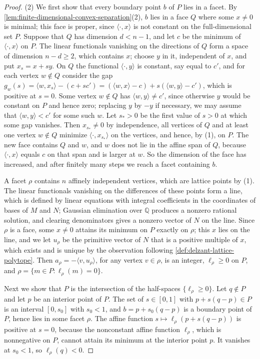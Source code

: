 \begin{proof}
(2) We first show that every boundary point $b$ of $P$ lies in a facet. By \cref{lem:finite-dimensional-convex-separation}(2), $b$ lies in a face $Q$ where some $x\neq0$ is minimal; this face is proper, since $\langle\cdot,x\rangle$ is not constant on the full-dimensional set $P$. Suppose that $Q$ has dimension $d<n-1$, and let $c$ be the minimum of $\langle\cdot,x\rangle$ on $P$. The linear functionals vanishing on the directions of $Q$ form a space of dimension $n-d\geq2$, which contains $x$; choose $y$ in it, independent of $x$, and put $x_s=x+sy$. On $Q$ the functional $\langle\cdot,y\rangle$ is constant, say equal to $c'$, and for each vertex $w\notin Q$ consider the gap $g_w(s)=\langle w,x_s\rangle-(c+sc')=(\langle w,x\rangle-c)+s(\langle w,y\rangle-c')$, which is positive at $s=0$. Some vertex $w\notin Q$ has $\langle w,y\rangle\neq c'$, since otherwise $y$ would be constant on $P$ and hence zero; replacing $y$ by $-y$ if necessary, we may assume that $\langle w,y\rangle<c'$ for some such $w$. Let $s_*>0$ be the first value of $s>0$ at which some gap vanishes. Then $x_{s_*}\neq0$ by independence, all vertices of $Q$ and at least one vertex $w\notin Q$ minimize $\langle\cdot,x_{s_*}\rangle$ on the vertices, and hence, by (1), on $P$. The new face contains $Q$ and $w$, and $w$ does not lie in the affine span of $Q$, because $\langle\cdot,x\rangle$ equals $c$ on that span and is larger at $w$. So the dimension of the face has increased, and after finitely many steps we reach a facet containing $b$.

A facet $\rho$ contains $n$ affinely independent vertices, which are lattice points by (1). The linear functionals vanishing on the differences of these points form a line, which is defined by linear equations with integral coefficients in the coordinates of bases of $M$ and $N$; Gaussian elimination over $\mathbb Q$ produces a nonzero rational solution, and clearing denominators gives a nonzero vector of $N$ on the line. Since $\rho$ is a face, some $x\neq0$ attains its minimum on $P$ exactly on $\rho$; this $x$ lies on the line, and we let $u_\rho$ be the primitive vector of $N$ that is a positive multiple of $x$, which exists and is unique by the observation following \cref{def:delzant-lattice-polytope}. Then $a_\rho=-\langle v,u_\rho\rangle$, for any vertex $v\in\rho$, is an integer, $\ell_\rho\geq0$ on $P$, and $\rho=\{m\in P:\ell_\rho(m)=0\}$.

Next we show that $P$ is the intersection of the half-spaces $\{\ell_\rho\geq0\}$. Let $q\notin P$ and let $p$ be an interior point of $P$. The set of $s\in[0,1]$ with $p+s(q-p)\in P$ is an interval $[0,s_0]$ with $s_0<1$, and $b=p+s_0(q-p)$ is a boundary point of $P$, hence lies in some facet $\rho$. The affine function $s\mapsto\ell_\rho(p+s(q-p))$ is positive at $s=0$, because the nonconstant affine function $\ell_\rho$, which is nonnegative on $P$, cannot attain its minimum at the interior point $p$. It vanishes at $s_0<1$, so $\ell_\rho(q)<0$.


\end{proof}
